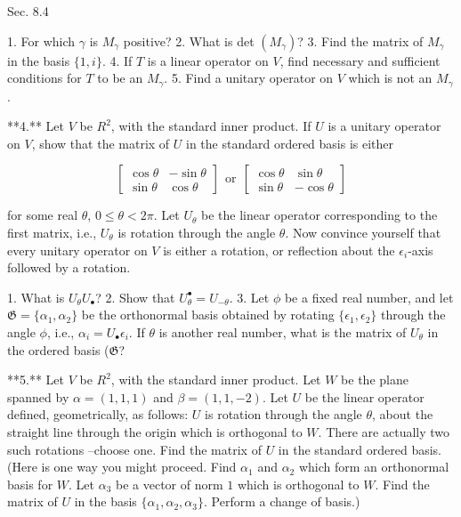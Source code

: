 Sec. 8.4

1. For which \(\gamma\) is \(M_{\gamma}\) positive? 2. What is det \((M_{\gamma})\)? 3. Find the matrix of \(M_{\gamma}\) in the basis \(\{1,i\}\). 4. If \(T\) is a linear operator on \(V\), find necessary and sufficient conditions for \(T\) to be an \(M_{\gamma}\). 5. Find a unitary operator on \(V\) which is not an \(M_{\gamma}\).

**4.** Let \(V\) be \(R^{2}\), with the standard inner product. If \(U\) is a unitary operator on \(V\), show that the matrix of \(U\) in the standard ordered basis is either

\[\begin{bmatrix}\cos\theta&-\sin\theta\\ \sin\theta&\cos\theta\end{bmatrix}\ \ \text{or}\ \ \begin{bmatrix}\cos\theta&\sin \theta\\ \sin\theta&-\cos\theta\end{bmatrix}\]

for some real \(\theta\), \(0\leq\theta<2\pi\). Let \(U_{\theta}\) be the linear operator corresponding to the first matrix, i.e., \(U_{\theta}\) is rotation through the angle \(\theta\). Now convince yourself that every unitary operator on \(V\) is either a rotation, or reflection about the \(\epsilon_{i}\)-axis followed by a rotation.

1. What is \(U_{\theta}U_{\bullet}\)? 2. Show that \(U_{\theta}^{\bullet}=U_{-\theta}\). 3. Let \(\phi\) be a fixed real number, and let \(\mathfrak{G}=\{\alpha_{1},\alpha_{2}\}\) be the orthonormal basis obtained by rotating \(\{\epsilon_{1},\epsilon_{2}\}\) through the angle \(\phi\), i.e., \(\alpha_{i}=U_{\bullet}\epsilon_{i}\). If \(\theta\) is another real number, what is the matrix of \(U_{\theta}\) in the ordered basis (\(\mathfrak{G}\)?

**5.** Let \(V\) be \(R^{2}\), with the standard inner product. Let \(W\) be the plane spanned by \(\alpha=(1,1,1)\) and \(\beta=(1,1,-2)\). Let \(U\) be the linear operator defined, geometrically, as follows: \(U\) is rotation through the angle \(\theta\), about the straight line through the origin which is orthogonal to \(W\). There are actually two such rotations --choose one. Find the matrix of \(U\) in the standard ordered basis. (Here is one way you might proceed. Find \(\alpha_{1}\) and \(\alpha_{2}\) which form an orthonormal basis for \(W\). Let \(\alpha_{3}\) be a vector of norm \(1\) which is orthogonal to \(W\). Find the matrix of \(U\) in the basis \(\{\alpha_{1},\alpha_{2},\alpha_{3}\}\). Perform a change of basis.)

